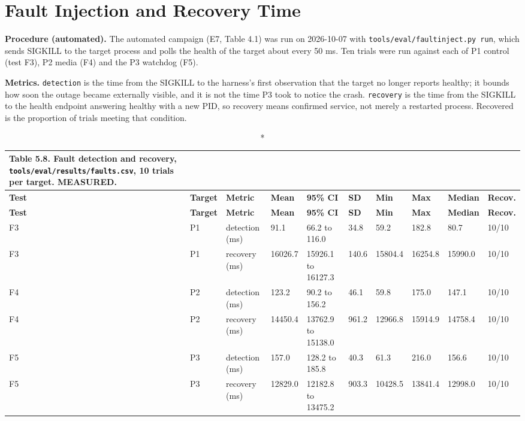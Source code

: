 \section{Fault Injection and Recovery Time}

\textbf{Procedure (automated).} The automated campaign (E7, Table 4.1) was run on 2026-10-07 with \texttt{tools/eval/faultinject.py run}, which sends SIGKILL to the target process and polls the health of the target about every 50 ms. Ten trials were run against each of P1 control (test F3), P2 media (F4) and the P3 watchdog (F5).

\textbf{Metrics.} \texttt{detection} is the time from the SIGKILL to the harness's first observation that the target no longer reports healthy; it bounds how soon the outage became externally visible, and it is not the time P3 took to notice the crash. \texttt{recovery} is the time from the SIGKILL to the health endpoint answering healthy with a new PID, so recovery means confirmed service, not merely a restarted process. Recovered is the proportion of trials meeting that condition.

\begin{center}
\scriptsize
\begin{longtable}{|p{0.6cm}|p{0.85cm}|p{1.6cm}|p{1.0cm}|p{2.3cm}|p{0.7cm}|p{1.1cm}|p{1.1cm}|p{1.1cm}|p{0.8cm}|}
\caption*{Table 5.8. Fault detection and recovery, \texttt{tools/eval/results/faults.csv}, 10 trials per target. MEASURED.}
\addcontentsline{lot}{table}{\protect\numberline{5.8}Fault detection and recovery, \texttt{tools/eval/results/faults.csv}, 10 trials per target. MEASURED.}
\\
\hline
\textbf{Test} & \textbf{Target} & \textbf{Metric} & \textbf{Mean} & \textbf{95\% CI} & \textbf{SD} & \textbf{Min} & \textbf{Max} & \textbf{Median} & \textbf{Recov.} \\
\hline
\endfirsthead
\hline
\textbf{Test} & \textbf{Target} & \textbf{Metric} & \textbf{Mean} & \textbf{95\% CI} & \textbf{SD} & \textbf{Min} & \textbf{Max} & \textbf{Median} & \textbf{Recov.} \\
\hline
\endhead
F3 & P1 & detection (ms) & 91.1 & 66.2 to 116.0 & 34.8 & 59.2 & 182.8 & 80.7 & 10/10 \\
\hline
F3 & P1 & recovery (ms) & 16026.7 & 15926.1 to 16127.3 & 140.6 & 15804.4 & 16254.8 & 15990.0 & 10/10 \\
\hline
F4 & P2 & detection (ms) & 123.2 & 90.2 to 156.2 & 46.1 & 59.8 & 175.0 & 147.1 & 10/10 \\
\hline
F4 & P2 & recovery (ms) & 14450.4 & 13762.9 to 15138.0 & 961.2 & 12966.8 & 15914.9 & 14758.4 & 10/10 \\
\hline
F5 & P3 & detection (ms) & 157.0 & 128.2 to 185.8 & 40.3 & 61.3 & 216.0 & 156.6 & 10/10 \\
\hline
F5 & P3 & recovery (ms) & 12829.0 & 12182.8 to 13475.2 & 903.3 & 10428.5 & 13841.4 & 12998.0 & 10/10 \\
\hline
\end{longtable}
\end{center}

